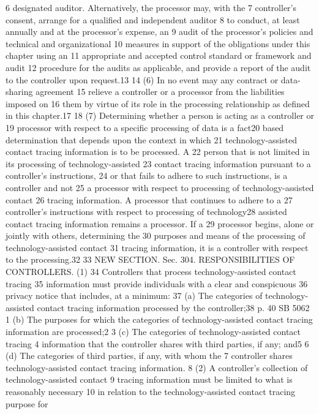 6 designated auditor. Alternatively, the processor may, with the
7 controller's consent, arrange for a qualified and independent auditor
8 to conduct, at least annually and at the processor's expense, an
9 audit of the processor's policies and technical and organizational
10 measures in support of the obligations under this chapter using an
11 appropriate and accepted control standard or framework and audit
12 procedure for the audits as applicable, and provide a report of the
audit to the controller upon request.13
14 (6) In no event may any contract or data-sharing agreement
15 relieve a controller or a processor from the liabilities imposed on
16 them by virtue of its role in the processing relationship as defined
in this chapter.17
18 (7) Determining whether a person is acting as a controller or
19 processor with respect to a specific processing of data is a fact20 based determination that depends upon the context in which
21 technology-assisted contact tracing information is to be processed. A
22 person that is not limited in its processing of technology-assisted
23 contact tracing information pursuant to a controller's instructions,
24 or that fails to adhere to such instructions, is a controller and not
25 a processor with respect to processing of technology-assisted contact
26 tracing information. A processor that continues to adhere to a
27 controller's instructions with respect to processing of technology28 assisted contact tracing information remains a processor. If a
29 processor begins, alone or jointly with others, determining the
30 purposes and means of the processing of technology-assisted contact
31 tracing information, it is a controller with respect to the
processing.32
33 NEW SECTION. Sec. 304. RESPONSIBILITIES OF CONTROLLERS. (1)
34 Controllers that process technology-assisted contact tracing
35 information must provide individuals with a clear and conspicuous
36 privacy notice that includes, at a minimum:
37 (a) The categories of technology-assisted contact tracing
information processed by the controller;38
p. 40 SB 5062
1 (b) The purposes for which the categories of technology-assisted
contact tracing information are processed;2
3 (c) The categories of technology-assisted contact tracing
4 information that the controller shares with third parties, if any;
and5
6 (d) The categories of third parties, if any, with whom the
7 controller shares technology-assisted contact tracing information.
8 (2) A controller's collection of technology-assisted contact
9 tracing information must be limited to what is reasonably necessary
10 in relation to the technology-assisted contact tracing purpose for
